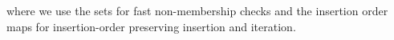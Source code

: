 where we use the sets for fast non-membership checks and the insertion order maps for insertion-order preserving insertion and iteration.

%
%


